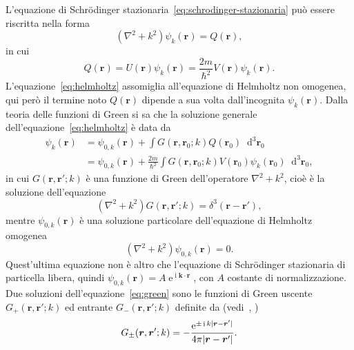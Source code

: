 \documentclass[a4paper,fleqn,twoside,12pt]{article}
\newcommand*{\dd}{\mathop{}\!\mathrm{d}} %
\DeclareMathOperator{\e}{\mathrm{e}} %
\DeclareMathOperator{\uimm}{\mathrm{i}} %
\DeclarePairedDelimiter{\abs}{\lvert}{\rvert}
\begin{document}
L'equazione di Schrödinger stazionaria~\eqref{eq:schrodinger-stazionaria} può
essere riscritta nella forma
\begin{equation}
  \label{eq:helmholtz}
  (\nabla^{2} + k^{2})\psi_{k}(\bm{r}) = Q(\bm{r}),
\end{equation}
in cui
\begin{equation}
  Q(\bm{r}) = U(\bm{r})\psi_{k}(\bm{r}) =
  \frac{2m}{\hslash^{2}}V(\bm{r})\psi_{k}(\bm{r}).
\end{equation}
L'equazione~\eqref{eq:helmholtz} assomiglia all'equazione di Helmholtz non
omogenea, qui però il termine noto $Q(\bm{r})$ dipende a sua volta
dall'incognita $\psi_{k}(\bm{r})$.
Dalla teoria delle funzioni di Green si sa che la soluzione generale
dell'equazione~\eqref{eq:helmholtz} è data da
\begin{equation}
  \begin{split}
    \psi_{k}(\bm{r}) &= \psi_{0,k}(\bm{r}) + \int
    G(\bm{r},\bm{r}_{0};k)Q(\bm{r}_{0})\dd^{3}\bm{r}_{0} \\
    &= \psi_{0,k}(\bm{r}) + \frac{2m}{\hslash^{2}}\int
    G(\bm{r},\bm{r}_{0};k)V(\bm{r}_{0})\psi_{k}(\bm{r}_{0})\dd^{3}\bm{r}_{0},
  \end{split}
\end{equation}
in cui $G(\bm{r},\bm{r}';k)$ è una funzione di Green dell'operatore
$\nabla^{2} + k^{2}$, cioè è la soluzione dell'equazione
\begin{equation}
  \label{eq:green}
  (\nabla^{2} + k^{2})G(\bm{r},\bm{r}';k) = \delta^{3}(\bm{r} - \bm{r}'),
\end{equation}
mentre $\psi_{0,k}(\bm{r})$ è una soluzione particolare dell'equazione di
Helmholtz omogenea
\begin{equation}
  (\nabla^{2} + k^{2})\psi_{0,k}(\bm{r}) = 0.
\end{equation}
Quest'ultima equazione non è altro che l'equazione di Schrödinger stazionaria di
particella libera, quindi $\psi_{0,k}(\bm{r}) = A\e^{\uimm \bm{k}\cdot\bm{r}}$,
con $A$ costante di normalizzazione.  Due soluzioni
dell'equazione~\eqref{eq:green} sono le funzioni di Green uscente
$G_{+}(\bm{r},\bm{r}';k)$ ed entrante $G_{-}(\bm{r},\bm{r}';k)$ definite da
(vedi~\textcite[450-452]{ballentine:quantum-mechanics},
\textcite[408-411]{griffiths:introduction-qm})
\begin{equation}
  G_{\pm}(\bm{r},\bm{r}';k) = -\frac{\e^{\pm \uimm k\abs{\bm{r} -
        \bm{r}'}}}{4\pi \abs{\bm{r} - \bm{r}'}}.
\end{equation}
\end{document}
